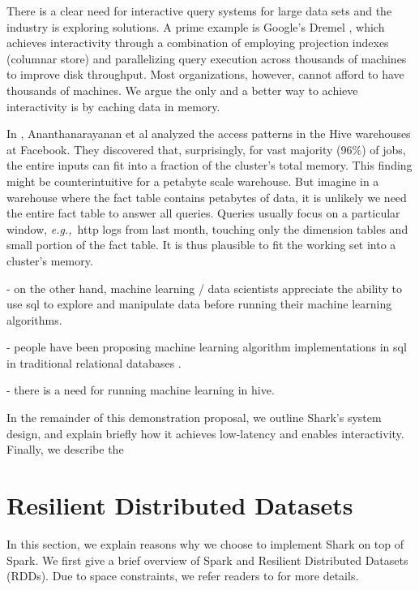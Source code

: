 \documentclass[preprint]{acm_proc_article-sp}
\newcommand{\eg}{{\em e.g.,}~}
\begin{document}
There is a clear need for interactive query systems for large data sets and the industry is exploring solutions. A prime example is Google's Dremel \cite{dremel}, which achieves interactivity through a combination of employing projection indexes (columnar store) and parallelizing query execution across thousands of machines to improve disk throughput. Most organizations, however, cannot afford to have thousands of machines. We argue the only and a better way to achieve interactivity is by caching data in memory.

In \cite{memento-hotos}, Ananthanarayanan et al analyzed the access patterns in the Hive warehouses at Facebook. They discovered that, surprisingly, for vast majority (96\%) of jobs, the entire inputs can fit into a fraction of the cluster's total memory. This finding might be counterintuitive for a petabyte scale warehouse. But imagine in a warehouse where the fact table contains petabytes of data, it is unlikely we need the entire fact table to answer all queries. Queries usually focus on a particular window, \eg http logs from last month, touching only the dimension tables and small portion of the fact table. It is thus plausible to fit the working set into a cluster's memory.

- on the other hand, machine learning / data scientists appreciate the ability to use sql to explore and manipulate data before running their machine learning algorithms.

- people have been proposing machine learning algorithm implementations in sql in traditional relational databases \cite{madlib}.

- there is a need for running machine learning in hive.

In the remainder of this demonstration proposal, we outline Shark's system design, and explain briefly how it achieves low-latency and enables interactivity. Finally, we describe the 


\section{Resilient Distributed Datasets}
In this section, we explain reasons why we choose to implement Shark on top of Spark. We first give a brief overview of Spark and Resilient Distributed Datasets (RDDs). Due to space constraints, we refer readers to \cite{spark-tr} for more details.
\end{document}
